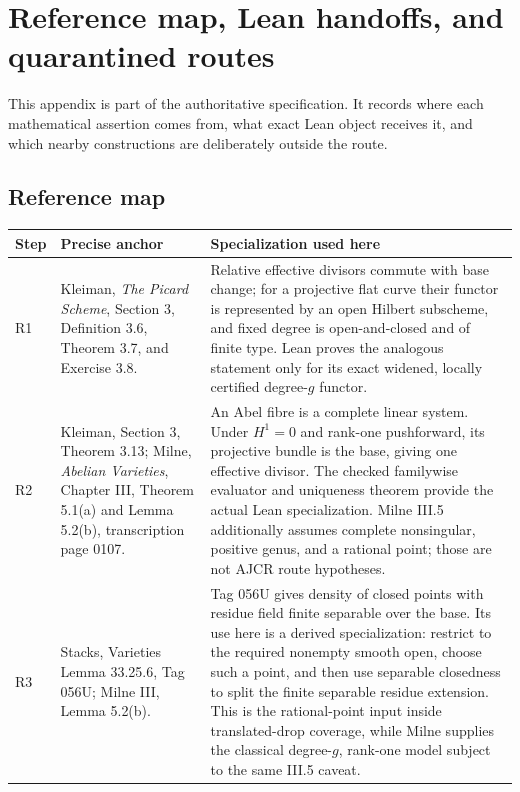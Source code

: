 \chapter{Reference map, Lean handoffs, and quarantined routes}
\label{route-app-technical}

This appendix is part of the authoritative specification.  It records where
each mathematical assertion comes from, what exact Lean object receives it,
and which nearby constructions are deliberately outside the route.

\section{Reference map}
\label{route-app-reference-map}

\begin{center}
\begin{tabular}{p{}p{}p{}}
\textbf{Step} & \textbf{Precise anchor} & \textbf{Specialization used here}\\ \hline
R1 & Kleiman, \emph{The Picard Scheme}, Section 3, Definition 3.6,
Theorem 3.7, and Exercise 3.8. & Relative effective divisors commute with
base change; for a projective flat curve their functor is represented by an
open Hilbert subscheme, and fixed degree is open-and-closed and of finite
type.  Lean proves the analogous statement only for its exact widened,
locally certified degree-\(g\) functor.\\
R2 & Kleiman, Section 3, Theorem 3.13; Milne, \emph{Abelian Varieties},
Chapter III, Theorem 5.1(a) and Lemma 5.2(b), transcription page 0107. & An
Abel fibre is a complete linear system.  Under \(H^1=0\) and rank-one
pushforward, its projective bundle is the base, giving one effective divisor.
The checked familywise evaluator and uniqueness theorem provide the actual
Lean specialization.  Milne III.5 additionally assumes complete nonsingular,
positive genus, and a rational point; those are not AJCR route hypotheses.\\
R3 & Stacks, Varieties Lemma 33.25.6, Tag 056U; Milne III, Lemma 5.2(b). & Tag
056U gives density of closed points with residue field finite separable over
the base.  Its use here is a derived specialization: restrict to the required
nonempty smooth open, choose such a point, and then use separable closedness to
split the finite separable residue extension.  This is the rational-point
input inside translated-drop coverage, while Milne supplies the
classical degree-\(g\), rank-one model subject to the same III.5 caveat.\\
\end{tabular}
\end{center}


